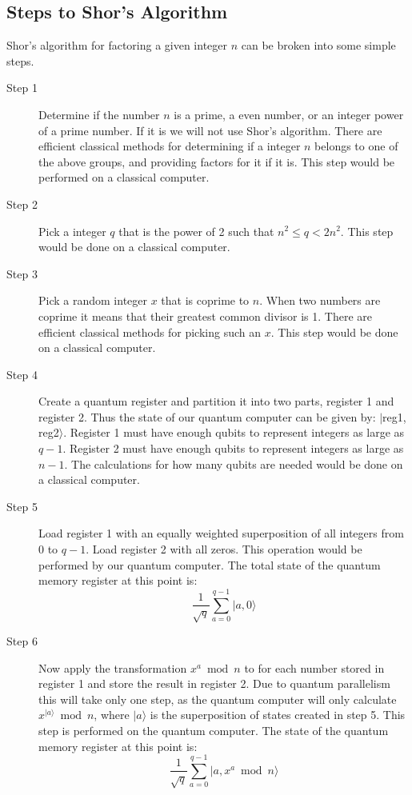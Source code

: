 \documentclass[]{article}
\begin{document}
\subsection{Steps to Shor's Algorithm}

Shor's algorithm for factoring a given integer $n$ can be broken into
some simple steps.

\begin{description}

\item[Step 1] Determine if the number $n$ is a prime, a even number,
  or an integer power of a prime number.  If it is we will not use
  Shor's algorithm.  There are efficient classical methods for
  determining if a integer $n$ belongs to one of the above groups, and
  providing factors for it if it is.  This step would be performed on
  a classical computer.

\item[Step 2] Pick a integer $q$ that is the power of 2 such that
  $n^{2} \leq q < 2n^{2}$.  This step would be done on a classical
  computer.

\item[Step 3] Pick a random integer $x$ that is coprime to $n$.  When
  two numbers are coprime it means that their greatest common divisor
  is 1.  There are efficient classical methods for picking such an
  $x$.  This step would be done on a classical computer.

\item[Step 4] Create a quantum register and partition it into two
  parts, register 1 and register 2.  Thus the state of our quantum
  computer can be given by: $|$reg1, reg2$ \rangle$.  Register 1 must
  have enough qubits to represent integers as large as $q - 1$.
  Register 2 must have enough qubits to represent integers as large as
  $n - 1$.  The calculations for how many qubits are needed would be
  done on a classical computer.

\item[Step 5] Load register 1 with an equally weighted superposition
  of all integers from 0 to $q - 1$.  Load register 2 with all zeros.
  This operation would be performed by our quantum computer.  The
  total state of the quantum memory register at this point is:
	\[\frac{1}{\sqrt{q}}\sum_{a = 0}^{q - 1} |a, 0 \rangle\]

\item[Step 6] Now apply the transformation $x^{a} \bmod n$ to for each
  number stored in register 1 and store the result in register 2.  Due
  to quantum parallelism this will take only one step, as the quantum
  computer will only calculate $x^{|a \rangle } \bmod n$, where $|a
  \rangle $ is the superposition of states created in step 5.  This
  step is performed on the quantum computer.  The state of the quantum
  memory register at this point is:
	\[\frac{1}{\sqrt{q}}\sum_{a=0}^{q-1}|a,x^{a} \bmod n \rangle \]


\end{description}
\end{document}
